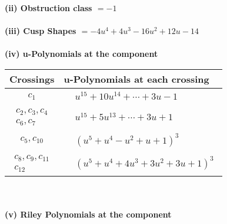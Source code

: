 \documentclass[1p]{elsarticle_modified}
\theoremstyle{definition}
\begin{document}
\flushleft \textbf{(ii) Obstruction class $= -1$}\\~\\
\flushleft \textbf{(iii) Cusp Shapes $= -4 u^4+4 u^3-16 u^2+12 u-14$}\\~\\
\newpage\renewcommand{\arraystretch}{1}
\flushleft \textbf{(iv) u-Polynomials at the component}\newline \\
\begin{tabular}{m{50pt}|m{274pt}}
Crossings & \hspace{64pt}u-Polynomials at each crossing \\
\hline $$\begin{aligned}c_{1}\end{aligned}$$&$\begin{aligned}
&u^{15}+10 u^{14}+\cdots+3 u-1
\end{aligned}$\\
\hline $$\begin{aligned}c_{2},c_{3},c_{4}\\c_{6},c_{7}\end{aligned}$$&$\begin{aligned}
&u^{15}+5 u^{13}+\cdots+3 u+1
\end{aligned}$\\
\hline $$\begin{aligned}c_{5},c_{10}\end{aligned}$$&$\begin{aligned}
&(u^5+u^4- u^2+u+1)^3
\end{aligned}$\\
\hline $$\begin{aligned}c_{8},c_{9},c_{11}\\c_{12}\end{aligned}$$&$\begin{aligned}
&(u^5+u^4+4 u^3+3 u^2+3 u+1)^3
\end{aligned}$\\
\hline
\end{tabular}\\~\\
\newpage\renewcommand{\arraystretch}{1}
\flushleft \textbf{(v) Riley Polynomials at the component}\newline \\
\end{document}
